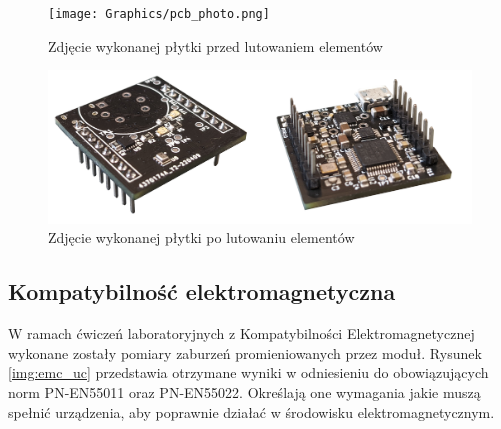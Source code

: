 \begin{figure}[H]
    \centering
    \texttt{[image: Graphics/pcb\_photo.png]}
    \caption{Zdjęcie wykonanej płytki przed lutowaniem elementów}
    \label{img:pcb_photo}
\end{figure}

\begin{figure}[H]
    \centering
    \includegraphics[width=\textwidth, height=\textheight, keepaspectratio]{Graphics/pcb_rdy_photo.png}
    \caption{Zdjęcie wykonanej płytki po lutowaniu elementów}
    \label{img:pcb_rdy_photo}
\end{figure}

\subsection{Kompatybilność elektromagnetyczna}
W ramach ćwiczeń laboratoryjnych z Kompatybilności Elektromagnetycznej wykonane zostały pomiary zaburzeń promieniowanych przez moduł. 
Rysunek \ref{img:emc_uc} przedstawia otrzymane wyniki w odniesieniu do obowiązujących norm PN-EN55011 oraz PN-EN55022. Określają one
wymagania jakie muszą spełnić urządzenia, aby poprawnie działać w środowisku elektromagnetycznym.

